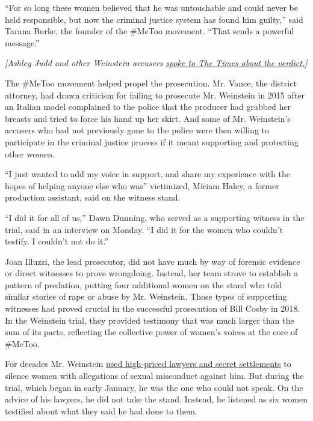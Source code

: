 ``For so long these women believed that he was untouchable and could
never be held responsible, but now the criminal justice system has found
him guilty,'' said Tarana Burke, the founder of the \#MeToo movement.
``That sends a powerful message.''

\emph{{[}Ashley Judd and other Weinstein accusers}
\href{https://www.nytimes3xbfgragh.onion/2020/02/24/nyregion/harvey-weinstein-accusers.html?action=click\&module=Intentional\&pgtype=Article}{\emph{spoke
to The Times about the verdict.}}\emph{{]}}

The \#MeToo movement helped propel the prosecution. Mr. Vance, the
district attorney, had drawn criticism for failing to prosecute Mr.
Weinstein in 2015 after an Italian model complained to the police that
the producer had grabbed her breasts and tried to force his hand up her
skirt. And some of Mr. Weinstein's accusers who had not previously gone
to the police were then willing to participate in the criminal justice
process if it meant supporting and protecting other women.

``I just wanted to add my voice in support, and share my experience with
the hopes of helping anyone else who was'' victimized, Miriam Haley, a
former production assistant, said on the witness stand.

``I did it for all of us,'' Dawn Dunning, who served as a supporting
witness in the trial, said in an interview on Monday. ``I did it for the
women who couldn't testify. I couldn't not do it.''

Joan Illuzzi, the lead prosecutor, did not have much by way of forensic
evidence or direct witnesses to prove wrongdoing. Instead, her team
strove to establish a pattern of predation, putting four additional
women on the stand who told similar stories of rape or abuse by Mr.
Weinstein. Those types of supporting witnesses had proved crucial in the
successful prosecution of Bill Cosby in 2018. In the Weinstein trial,
they provided testimony that was much larger than the sum of its parts,
reflecting the collective power of women's voices at the core of
\#MeToo.

For decades Mr. Weinstein
\href{https://www.nytimes3xbfgragh.onion/interactive/2017/12/05/us/harvey-weinstein-complicity.html}{used
high-priced lawyers and secret settlements} to silence women with
allegations of sexual misconduct against him. But during the trial,
which began in early January, he was the one who could not speak. On the
advice of his lawyers, he did not take the stand. Instead, he listened
as six women testified about what they said he had done to them.

